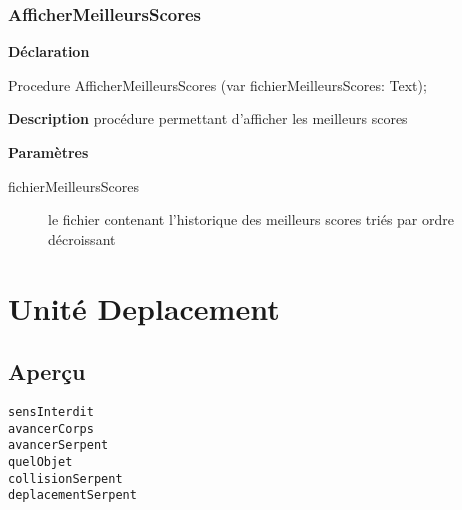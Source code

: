 \documentclass{report}
\newif\ifpdf
\begin{document}
\subsection*{AfficherMeilleursScores}
\fi
\label{Affichage-AfficherMeilleursScores}
\begin{list}{}{
\setlength{\itemindent}{0cm}
\setlength{\listparindent}{0cm}
\setlength{\leftmargin}{\evensidemargin}
\addtolength{\leftmargin}{\tmplength}
\settowidth{\labelsep}{X}
\addtolength{\leftmargin}{\labelsep}
\setlength{\labelwidth}{\tmplength}
}
\item[\textbf{Déclaration}\hfill]
\ifpdf
\begin{flushleft}
\fi
\begin{ttfamily}
Procedure AfficherMeilleursScores (var fichierMeilleursScores: Text);\end{ttfamily}

\ifpdf
\end{flushleft}
\fi

\par
\item[\textbf{Description}]
procédure permettant d'afficher les meilleurs scores \par
\item[\textbf{Paramètres}]
\begin{description}
\item[fichierMeilleursScores] le fichier contenant l'historique des meilleurs scores triés par ordre décroissant
\end{description}


\end{list}
\chapter{Unité Deplacement}
\label{Deplacement}
\section{Aperçu}
\begin{description}
\item[\texttt{sensInterdit}]
\item[\texttt{avancerCorps}]
\item[\texttt{avancerSerpent}]
\item[\texttt{quelObjet}]
\item[\texttt{collisionSerpent}]
\item[\texttt{deplacementSerpent}]
\end{description}
\end{document}
